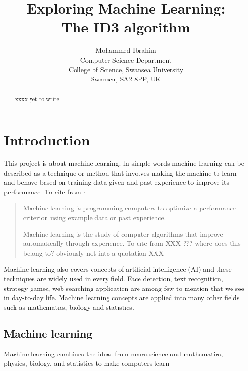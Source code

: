\documentclass{article}
\begin{document}
\title{Exploring Machine Learning:\\
  The ID3 algorithm}

\author{Mohammed Ibrahim\\
 Computer Science Department\\
  College of Science, Swansea University\\
  Swansea, SA2 8PP, UK
}

\maketitle
\begin{abstract}
xxxx yet to write
\end{abstract}
\pagebreak
\tableofcontents
\pagebreak
\section{Introduction}
\label{sec:int}

This project is about machine learning. In simple words machine learning can be described as a technique or method that involves making the machine to learn and behave based on training data given and past experience to improve its performance. To cite from \cite{Alpaydin2010MachineLearning}:
\begin{quote}
  Machine learning is programming computers to optimize a performance
  criterion using example data or past experience.

  Machine learning is the study of computer algorithms that improve automatically through experience. To cite from \cite{Mitchell1997MachineLearning} XXX ??? where does this belong to? obviously not into a quotation XXX
\end{quote}
Machine learning also covers concepts of artificial intelligence (AI) and these techniques are widely used in every field. Face detection, text recognition, strategy games, web searching application are among few to mention that we see in day-to-day life. Machine learning concepts are applied into many other fields such as mathematics, biology and statistics.



\subsection{Machine learning}
\label{sec:machinelearn}

Machine learning combines the ideas from neuroscience and mathematics, physics, biology, and statistics to make computers learn.
\end{document}
